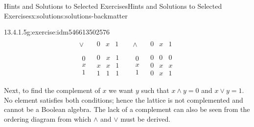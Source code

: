 \documentclass[oneside,10pt,]{book}
\newcommand{\blocktitlefont}{\relax}
\newcommand{\terminology}[1]{\textbf{#1}}
\numberwithin{equation}{section}
\begin{document}
\begin{solutions-chapter}{Hints and Solutions to Selected Exercises}{}{Hints and Solutions to Selected Exercises}{}{}{x:solutions:solutions-backmatter}
\begin{divisionsolution}{13.4.1.5}{}{g:exercise:idm546613502576}
\begin{equation*}
\begin{array}{lr}
\begin{array}{c|c}
\lor  & 
\begin{array}{ccc}
0 & x & 1 \\
\end{array}
\\
\hline
\begin{array}{c}
0 \\
x \\
1 \\
\end{array}
& 
\begin{array}{ccc}
0 & x & 1 \\
x & x & 1 \\
1 & 1 & 1 \\
\end{array}
\\
\end{array}       
& 
\begin{array}{c|c}
\land  & 
\begin{array}{ccc}
0 & x & 1 \\
\end{array}
\\
\hline
\begin{array}{c}
0 \\
x \\
1 \\
\end{array}
& 
\begin{array}{ccc}
0 & 0 & 0 \\
0 & x & x \\
0 & x & 1 \\
\end{array}
\\
\end{array}
\end{array}
\end{equation*}
Next, to find the complement of \(x\) we want \(y\) such that \(x \land  y = 0\) and \(x \lor  y = 1\). No element satisfies both conditions; hence the lattice is not complemented and cannot be a Boolean algebra. The lack of a complement can also be seen from the ordering diagram from which \(\land\) and \(\lor\) must be derived.%
\end{divisionsolution}%
\end{solutions-chapter}
\end{document}
